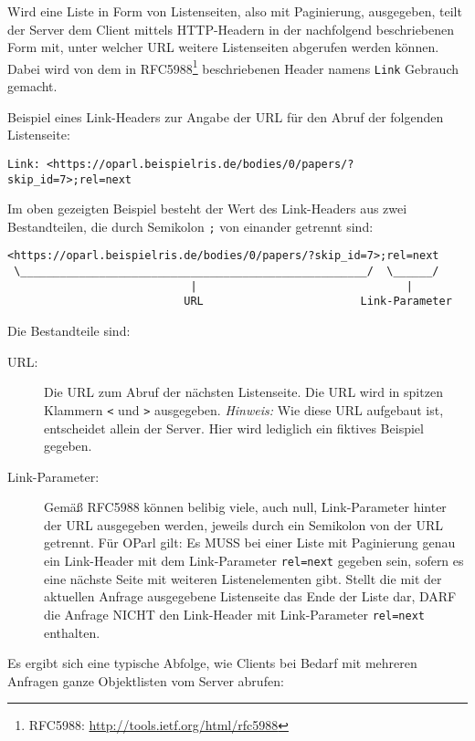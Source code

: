 \documentclass[,a4paper]{article}
\begin{document}
Wird eine Liste in Form von Listenseiten, also mit Paginierung,
ausgegeben, teilt der Server dem Client mittels HTTP-Headern in der
nachfolgend beschriebenen Form mit, unter welcher URL weitere
Listenseiten abgerufen werden können. Dabei wird von dem in
RFC5988\footnote{RFC5988: \url{http://tools.ietf.org/html/rfc5988}}
beschriebenen Header namens \texttt{Link} Gebrauch gemacht.

Beispiel eines Link-Headers zur Angabe der URL für den Abruf der
folgenden Listenseite:

\begin{verbatim}
Link: <https://oparl.beispielris.de/bodies/0/papers/?skip_id=7>;rel=next
\end{verbatim}

Im oben gezeigten Beispiel besteht der Wert des Link-Headers aus zwei
Bestandteilen, die durch Semikolon \texttt{;} von einander getrennt
sind:

\begin{verbatim}
<https://oparl.beispielris.de/bodies/0/papers/?skip_id=7>;rel=next
 \_____________________________________________________/  \______/
                            |                                |
                           URL                        Link-Parameter
\end{verbatim}

Die Bestandteile sind:

\begin{description}
\item[URL:]
Die URL zum Abruf der nächsten Listenseite. Die URL wird in spitzen
Klammern \texttt{\textless{}} und \texttt{\textgreater{}} ausgegeben.
\emph{Hinweis:} Wie diese URL aufgebaut ist, entscheidet allein der
Server. Hier wird lediglich ein fiktives Beispiel gegeben.
\item[Link-Parameter:]
Gemäß RFC5988 können belibig viele, auch null, Link-Parameter hinter der
URL ausgegeben werden, jeweils durch ein Semikolon von der URL getrennt.
Für OParl gilt: Es MUSS bei einer Liste mit Paginierung genau ein
Link-Header mit dem Link-Parameter \texttt{rel=next} gegeben sein,
sofern es eine nächste Seite mit weiteren Listenelementen gibt. Stellt
die mit der aktuellen Anfrage ausgegebene Listenseite das Ende der Liste
dar, DARF die Anfrage NICHT den Link-Header mit Link-Parameter
\texttt{rel=next} enthalten.
\end{description}

Es ergibt sich eine typische Abfolge, wie Clients bei Bedarf mit
mehreren Anfragen ganze Objektlisten vom Server abrufen:
\end{document}
